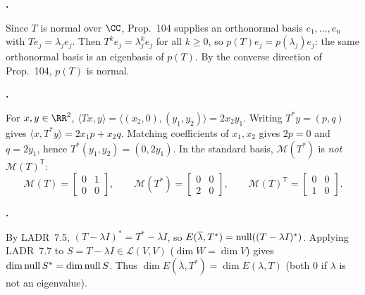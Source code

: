 \documentclass[10pt]{scrartcl}
\newcommand{\LL}{\mathcal L}\newcommand{\PP}{\mathcal P}\newcommand{\MM}{\mathcal M}
\begin{document}
\begin{prob}
  \textbf{. }\par
  \begin{steps}
    \ii Since $T$ is normal over $\CC$, Prop.~104 supplies an orthonormal basis $e_1,\dots,e_n$ with $Te_j=\lambda_j e_j$.
    \ii Then $T^ke_j=\lambda_j^k e_j$ for all $k\ge0$, so $p(T)e_j=p(\lambda_j)e_j$: the same orthonormal basis is an eigenbasis of $p(T)$.
    \ii By the converse direction of Prop.~104, $p(T)$ is normal.
  \end{steps}
\end{prob}

\begin{prob}
  \textbf{. }\par
  \begin{steps}
    \ii For $x,y\in\RR^2$, $\langle Tx,y\rangle=\langle(x_2,0),(y_1,y_2)\rangle=2x_2y_1$. Writing $T^*y=(p,q)$ gives $\langle x,T^*y\rangle=2x_1p+x_2q$.
    \ii Matching coefficients of $x_1,x_2$ gives $2p=0$ and $q=2y_1$, hence $T^*(y_1,y_2)=(0,2y_1)$.
    \ii In the standard basis, $\MM(T^*)$ is \emph{not} $\MM(T)^{\mathsf T}$:
    \[
      \MM(T)=\begin{bmatrix}0&1\\0&0\end{bmatrix},\qquad
      \MM(T^*)=\begin{bmatrix}0&0\\2&0\end{bmatrix},\qquad
      \MM(T)^{\mathsf T}=\begin{bmatrix}0&0\\1&0\end{bmatrix}.
    \]
  \end{steps}
\end{prob}

\begin{prob}
  \textbf{. }\par
  \begin{steps}
    \ii By LADR~7.5, $(T-\lambda I)^*=T^*-\overline{\lambda}I$, so $E(\overline{\lambda},T^*)=\operatorname{null}((T-\lambda I)^*)$.
    \ii Applying LADR~7.7 to $S=T-\lambda I\in\LL(V,V)$ ($\dim W=\dim V$) gives $\dim\operatorname{null} S^* = \dim\operatorname{null} S$.
    \ii Thus $\dim E(\overline{\lambda},T^*)=\dim E(\lambda,T)$ (both $0$ if $\lambda$ is not an eigenvalue).
  \end{steps}
\end{prob}
\end{document}
